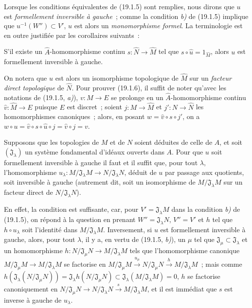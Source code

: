 Lorsque les conditions équivalentes de (19.1.5) sont remplies, nous dirons que
$u$ est \emph{formellement inversible à gauche}~; comme la condition \emph{b)} de
(19.1.5) implique que $u^{-1}(W'')\subset V'$, $u$ est alors un \emph{monomorphisme
formel}. La terminologie est en outre justifiée par les corollaires suivants~:

\begin{corollary}[19.1.6]
\label{0.19.1.6-fr}
S'il existe un $\widehat A$-homomorphisme continu
$s:\widehat N\to\widehat M$ tel que
$s\circ\widehat u=1_{\widehat M}$, alors $u$ est formellement inversible à
gauche.
\end{corollary}

On notera que $\widehat u$ est alors un isomorphisme topologique de
$\widehat M$ sur un \emph{facteur direct topologique} de $\widehat N$. Pour
prouver (19.1.6), il suffit de noter qu'avec les notations de (19.1.5, \emph{a)}),
$v:M\to E$ se prolonge en un $\widehat A$-homomorphisme continu
$\widehat v:\widehat M\to E$ puisque $E$ est discret~; soient
$j:M\to\widehat M$ et $j':N\to\widehat N$ les homomorphismes canoniques~;
alors, en posant $w=\widehat v\circ s\circ j'$, on a
$w\circ u=\widehat v\circ s\circ\widehat u\circ j=\widehat v\circ j=v$.

\begin{corollary}[19.1.7]
\label{0.19.1.7-fr}
Supposons que les topologies de $M$ et de $N$ soient déduites de celle de $A$,
et soit $(\mathfrak J_\lambda)$ un système fondamental d'idéaux ouverts dans
$A$. Pour que $u$ soit formellement inversible à gauche il faut et il suffit
que, pour tout $\lambda$, l'homomorphisme
$u_\lambda:M/\mathfrak J_\lambda M\to N/\mathfrak J_\lambda N$, déduit de
$u$ par passage aux quotients, soit inversible à gauche \textup{(autrement dit, soit
un isomorphisme de $M/\mathfrak J_\lambda M$ sur un facteur direct de
$N/\mathfrak J_\lambda N$)}.
\end{corollary}

En effet, la condition est suffisante, car, pour
$V'=\mathfrak J_\lambda M$ dans la condition \emph{b)} de (19.1.5), on répond à la
question en prenant $W''=\mathfrak J_\lambda N$, $V''=V'$ et $h$ tel que
$h\circ u_\lambda$ soit l'identité dans $M/\mathfrak J_\lambda M$.
Inversement, si $u$ est formellement inversible à gauche, alors, pour tout
$\lambda$, il y a, en vertu de (19.1.5, \emph{b)}), un $\mu$ tel que
$\mathfrak J_\mu\subset\mathfrak J_\lambda$ et un homomorphisme
$h:N/\mathfrak J_\mu N\to M/\mathfrak J_\lambda M$ tels que l'homomorphisme
canonique $M/\mathfrak J_\mu M\to M/\mathfrak J_\lambda M$ se factorise en
$M/\mathfrak J_\mu M\xrightarrow{u_\mu}N/\mathfrak J_\mu N\xrightarrow{h}M/\mathfrak J_\lambda M$~; mais comme
$h(\mathfrak J_\lambda(N/\mathfrak J_\mu N))=\mathfrak J_\lambda h(N/\mathfrak J_\mu N)
\subset\mathfrak J_\lambda(M/\mathfrak J_\lambda M)=0$, $h$ se factorise
canoniquement en
$N/\mathfrak J_\mu N\longrightarrow N/\mathfrak J_\lambda N\xrightarrow{s}M/\mathfrak J_\lambda M$, et il est immédiat que $s$ est inverse à gauche de $u_\lambda$.

